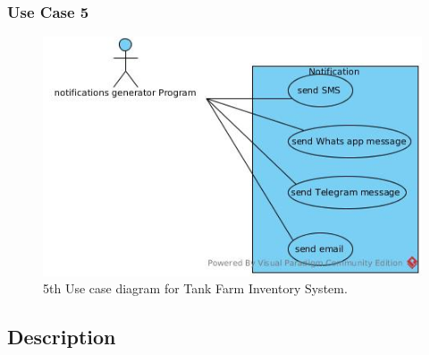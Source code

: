 \newpage
\subsubsection{Use Case 5}
\vspace*{0.5\baselineskip}
\begin{figure}[htbp]
	\begin{center}
		\includegraphics[width=0.85\linewidth]{./images/UC005.jpeg}
		\caption{5th Use case diagram for Tank Farm Inventory System.}
		\label{fig:UC005.jpeg}
	\end{center}
\end{figure}



\subsection{Description}
